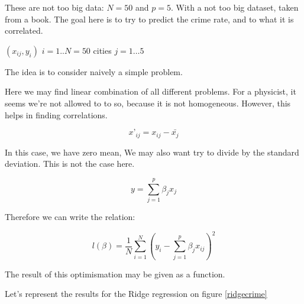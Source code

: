These are not too big data: $N=50$ and $p=5$.
With a not too big dataset, taken from a book. The goal here is to try to
predict the crime rate, and to what it is correlated.

$(x_{ij}, y_i)$ $i=1..N=50$ cities
$j=1…5$

The idea is to consider naively a simple problem.

Here we may find linear combination of all different problems.
For a physicist, it seems we’re not allowed to to so, because it is not
homogeneous. However, this helps in finding correlations.

\begin{equation}
    x’_{ij} = x_{ij} - \bar{x_j}
\end{equation}

In this case, we have zero mean, We may also want try to divide by the standard
deviation. This is not the case here.

\begin{equation}
    y=\sum_{j=1}^p \beta_j x_j
\end{equation}

Therefore we can write the relation:

\begin{equation}
    l(\beta) = \frac{1}{N} \sum_{i=1}^N (y_i - \sum_{j=1}^p \beta_j x_{ij})^2
\end{equation}

The result of this optimismation may be given as a function.

Let's represent the results for the Ridge regression on figure \ref{ridgecrime}

